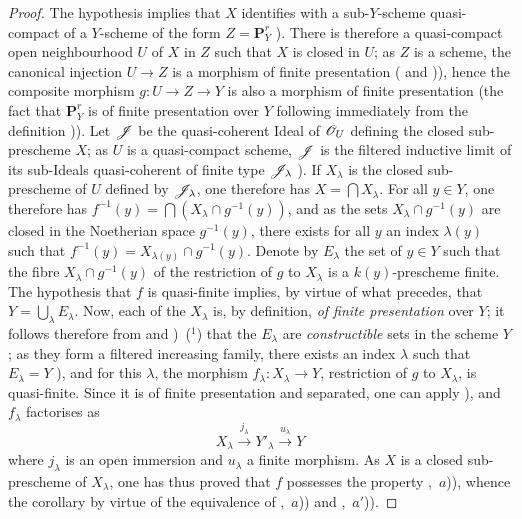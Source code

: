 \begin{proof}
The hypothesis implies that $X$ identifies with a sub-$Y$-scheme quasi-compact of a $Y$-scheme of the form $Z=\mathbf{P}^r_Y$ ).
There is therefore a quasi-compact open neighbourhood $U$ of $X$ in $Z$ such that $X$ is closed in $U$; as $Z$ is a scheme, the canonical injection $U\to Z$ is a morphism of finite presentation ( and )), hence the composite morphism $g:U\to Z\to Y$ is also a morphism of finite presentation (the fact that $\mathbf{P}^r_Y$ is of finite presentation over $Y$ following immediately from the definition )).
Let $\mathscr{J}$ be the quasi-coherent Ideal of $\mathscr{O}_U$ defining the closed sub-prescheme $X$; as $U$ is a quasi-compact scheme, $\mathscr{J}$ is the filtered inductive limit of its sub-Ideals quasi-coherent of finite type $\mathscr{J}_\lambda$ ).
If $X_\lambda$ is the closed sub-prescheme of $U$ defined by $\mathscr{J}_\lambda$, one therefore has $X=\bigcap X_\lambda$.
For all $y\in Y$, one therefore has $f^{-1}(y)=\bigcap(X_\lambda\cap g^{-1}(y))$, and as the sets $X_\lambda\cap g^{-1}(y)$ are closed in the Noetherian space $g^{-1}(y)$, there exists for all $y$ an index $\lambda(y)$ such that $f^{-1}(y)=X_{\lambda(y)}\cap g^{-1}(y)$.
Denote by $E_\lambda$ the set of $y\in Y$ such that the fibre $X_\lambda\cap g^{-1}(y)$ of the restriction of $g$ to $X_\lambda$ is a $k(y)$-prescheme finite.
The hypothesis that $f$ is quasi-finite implies, by virtue of what precedes, that $Y=\bigcup_\lambda E_\lambda$.
Now, each of the $X_\lambda$ is, by definition, \emph{of finite presentation} over $Y$; it follows therefore from  and )~($^1$) that the $E_\lambda$ are \emph{constructible} sets in the scheme $Y$; as they form a filtered increasing family, there exists an index $\lambda$ such that $E_\lambda=Y$ ), and for this $\lambda$, the morphism $f_\lambda:X_\lambda\to Y$, restriction of $g$ to $X_\lambda$, is quasi-finite. Since it is of finite presentation and separated, one can apply ), and $f_\lambda$ factorises as
\[
X_\lambda\xrightarrow{j_\lambda}Y'_\lambda\xrightarrow{u_\lambda}Y
\]
where $j_\lambda$ is an open immersion and $u_\lambda$ a finite morphism.
As $X$ is a closed sub-prescheme of $X_\lambda$, one has thus proved that $f$ possesses the property ,~$a$)), whence the corollary by virtue of the equivalence of ,~$a$)) and ,~$a'$)).
\end{proof}

